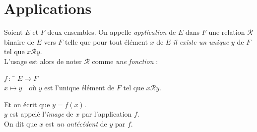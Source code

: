 \section{Applications}

\begin{definition}
    Soient $E$ et $F$ deux ensembles. On appelle \textit{application} de $E$ dans $F$ une relation $\mathcal{R}$ binaire de $E$ vers $F$ telle que pour tout élément $x$ de $E$ \textit{il existe un unique} $y$ de $F$ tel que $x\mathcal{R}y$.\\

    L'usage est alors de noter $\mathcal{R}$ comme \textit{une fonction} :
    \begin{tabbing}
        $f\,:\,$ \=	$E\longrightarrow F$\\
        \>	$x \longmapsto y$\ \ où $y$ est l'unique élément de $F$ tel que $x\mathcal{R}y$.
    \end{tabbing}
    Et on écrit que $y=f(x)$.\\

    $y$ est appelé l'\textit{image} de $x$ par l'application $f$.\\
    On dit que $x$ est \textit{un antécédent} de $y$ par $f$.
\end{definition}


